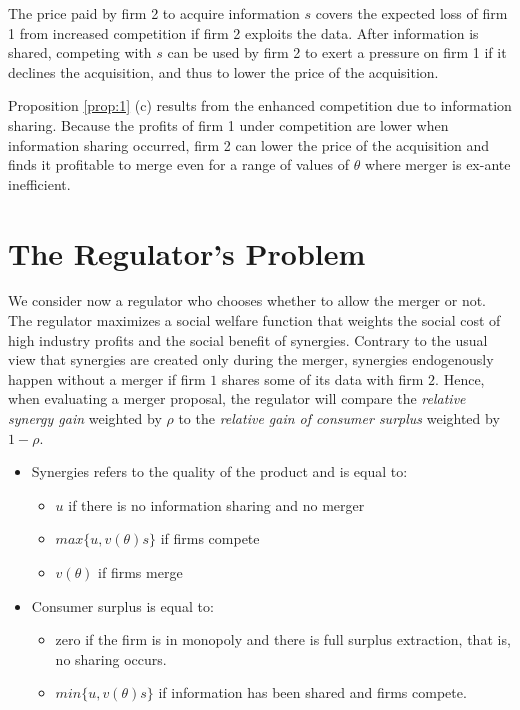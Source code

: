 \documentclass[a4paper,leqno]{article}%
\renewcommand{\t}{\theta}
\begin{document}
\medskip

The price paid by firm 2 to acquire information $s$ covers the expected loss of firm 1 from increased competition if firm 2 exploits the data. After information is shared, competing with $s$ can be used by firm 2 to exert a pressure on firm 1 if it declines the acquisition, and thus to lower the price of the acquisition. 

\medskip

Proposition \ref{prop:1} (c) results from the enhanced competition due to information sharing. Because the profits of firm 1 under competition are lower when information sharing occurred, firm 2 can lower the price of the acquisition and finds it profitable to merge even for a range of values of $\t$ where merger is ex-ante inefficient.

\medskip

\section{The Regulator's Problem}

We consider now a regulator who chooses whether to allow the merger or not. The regulator maximizes a social welfare function that weights the social cost of high industry profits and the social benefit of synergies. Contrary to the usual view that synergies are created only during the merger, synergies endogenously happen without a merger if firm $1$ shares some of its data with firm $2$. Hence, when evaluating a merger proposal, the regulator will compare the \emph{relative synergy gain} weighted by $\rho$ to the \emph{relative gain of consumer surplus} weighted by $1-\rho$.


\begin{itemize}
    \item Synergies refers to the quality of the product and is equal to:
    \begin{itemize}
        \item $u$ if there is no information sharing and no merger
        \item $max\{u,v(\t)s\}$ if firms compete
        \item $v(\t)$ if firms merge
    \end{itemize}
    \item Consumer surplus is equal to:
    \begin{itemize}
        \item zero if the firm is in monopoly and there is full surplus extraction, that is, no sharing occurs.
        \item $min\{u,v(\t)s\}$ if information has been shared and firms compete.
    \end{itemize}
\end{itemize}
\end{document}
